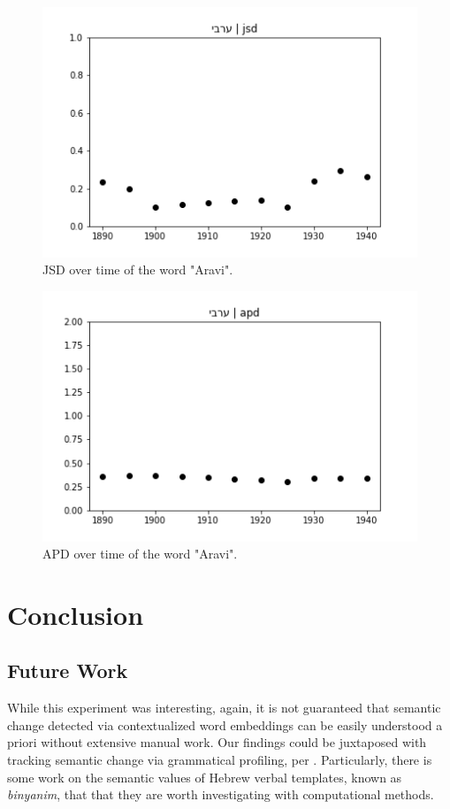 \documentclass[10pt, a4paper]{article}
\begin{document}
\begin{figure}[!h]
\begin{center}
\includegraphics[scale=0.5]{LREC_PAPER/aravi/ערבי_jsd.png}
\caption{JSD over time of the word "Aravi".}
\label{fig.7}
\end{center}
\end{figure}

\begin{figure}[!h]
\begin{center}
\includegraphics[scale=0.5]{LREC_PAPER/aravi/ערבי_apd.png}
\caption{APD over time of the word "Aravi".}
\label{fig.8}
\end{center}
\end{figure}
\section{Conclusion}
\subsection{Future Work}
While this experiment was interesting, again, it is not guaranteed that semantic change detected via contextualized word embeddings can be easily understood a priori without extensive manual work. Our findings could be juxtaposed with tracking semantic change via grammatical profiling, per \cite{grammaticalprofiling}. Particularly, there is some work on the semantic values of Hebrew verbal templates, known as \textit{binyanim}, that that they are worth investigating with computational methods. %
\end{document}
